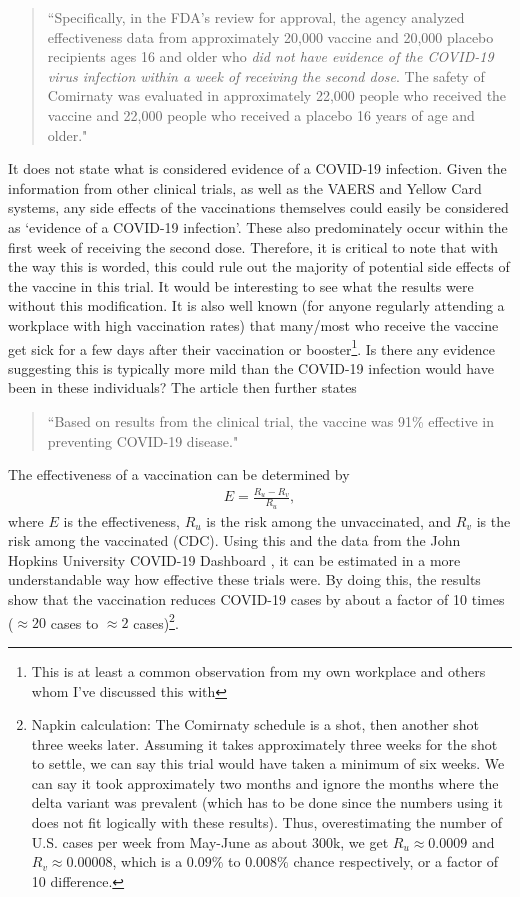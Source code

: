 \documentclass[10pt, a4paper, twocolumn]{book}
\begin{document}
\begin{quotation}
	``Specifically, in the FDA’s review for approval, the agency analyzed effectiveness data from approximately 20,000 vaccine and 20,000 placebo recipients ages 16 and older who \textit{did not have evidence of the COVID-19 virus infection within a week of receiving the second dose}. The safety of Comirnaty was evaluated in approximately 22,000 people who received the vaccine and 22,000 people who received a placebo 16 years of age and older." \citep{FDAApprovesVaccine}
\end{quotation}

It does not state what is considered evidence of a COVID-19 infection. Given the information from other clinical trials, as well as the VAERS and Yellow Card systems, any side effects of the vaccinations themselves could easily be considered as `evidence of a COVID-19 infection'. These also predominately occur within the first week of receiving the second dose. Therefore, it is critical to note that with the way this is worded, this could rule out the majority of potential side effects of the vaccine in this trial. It would be interesting to see what the results were without this modification. It is also well known (for anyone regularly attending a workplace with high vaccination rates) that many/most who receive the vaccine get sick for a few days after their vaccination or booster\footnote{This is at least a common observation from my own workplace and others whom I've discussed this with}. Is there any evidence suggesting this is typically more mild than the COVID-19 infection would have been in these individuals? The article then further states

\begin{quotation}
	``Based on results from the clinical trial, the vaccine was 91\% effective in preventing COVID-19 disease."
\end{quotation}

The effectiveness of a vaccination can be determined by
\begin{align}
	E = \frac{R_u-R_v}{R_u},
\end{align}
where $E$ is the effectiveness, $R_u$ is the risk among the unvaccinated, and $R_v$ is the risk among the vaccinated (CDC). Using this and the data from the John Hopkins University COVID-19 Dashboard \citep{JohnHopkinsMap}, it can be estimated in a more understandable way how effective these trials were. By doing this, the results show that the vaccination reduces COVID-19 cases by about a factor of 10 times ($\approx 20$ cases to $\approx 2$ cases)\footnote{Napkin calculation: The Comirnaty schedule is a shot, then another shot three weeks later. Assuming it takes approximately three weeks for the shot to settle, we can say this trial would have taken a minimum of six weeks. We can say it took approximately two months and ignore the months where the delta variant was prevalent (which has to be done since the numbers using it does not fit logically with these results). Thus, overestimating the number of U.S. cases per week from May-June as about 300k, we get $R_u \approx 0.0009$ and $R_v \approx 0.00008$, which is a $0.09\%$ to $0.008\%$ chance respectively, or a factor of 10 difference.}.
\end{document}
